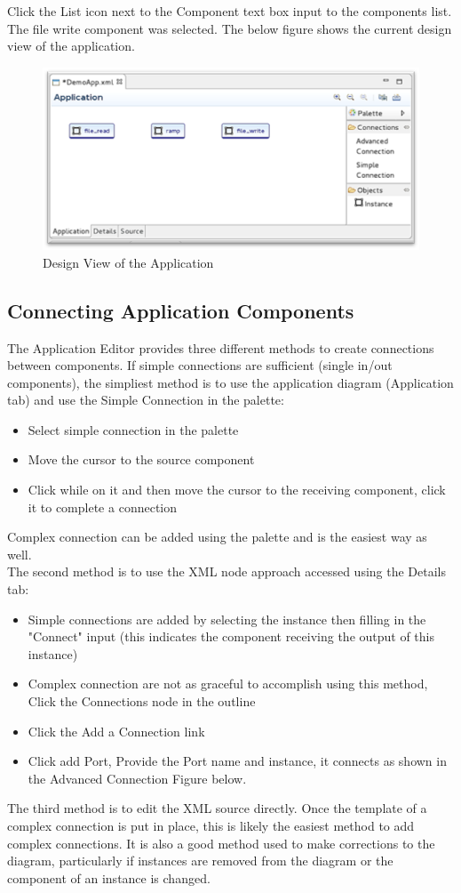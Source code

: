 \documentclass[10pt, a4paper, oneside]{article}
\begin{document}
Click the List icon next to the Component text box input to the components list. The file write component was selected. The below figure shows the current design view of the application.
\begin{figure}[h!]
	\centering
	\caption{Design View of the Application}{}
	\includegraphics[width=.85\textwidth]{DesignView.png}
 \end{figure}
\subsection{Connecting Application Components}
The Application Editor provides three different methods to create connections between components. If simple connections are sufficient (single in/out components), the simpliest method is to use the application diagram (Application tab) and use the Simple Connection in the palette:
\begin{itemize}
\item Select simple connection in the palette
\item Move the cursor to the source component
\item Click while on it and then move the cursor to the receiving component, click it to complete a connection
\end{itemize}
Complex connection can be added using the palette and is the easiest way as well. \\

The second method is to use the XML node approach accessed using the Details tab:
\begin{itemize}
\item	Simple connections are added by selecting the instance then filling in the "Connect" input (this indicates the component receiving the output of this instance)
\item	Complex connection are not as graceful to accomplish using this method, Click the Connections node in the outline
\item	Click the Add a Connection link
\item	Click add Port, Provide the Port name and instance, it connects as shown in the Advanced Connection Figure below.
\end{itemize}
The third method is to edit the XML source directly. Once the template of a complex connection is put in place, this is likely the easiest method to add complex connections. It is also a good method used to make corrections to the diagram, particularly if instances are removed from the diagram or the component of an instance is changed.
\end{document}

